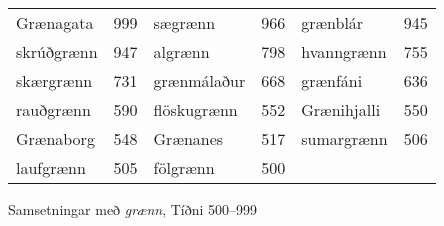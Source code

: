 \documentclass[../samsetningasafn.tex]{subfiles}
\begin{document}
\begin{wordlist}[H]
\begin{tcolorbox}

	\setlength{\extrarowheight}{3pt}
	\begin{tabular}{BlBlBl}
		Grænagata	& 999		& 
		sægrænn		& 966		& 
		grænblár		& 945		\\  		
		skrúðgrænn	& 947		& 
		algrænn		& 798		&  	
		hvanngrænn	& 755		\\  	
		skærgrænn	& 731		& 
		grænmálaður	& 668		& 	
		grænfáni		& 636		\\ 
		rauðgrænn	& 590		& 
		flöskugrænn	& 552		& 	
		Grænihjalli	& 550		\\ 
		Grænaborg	& 548		& 
		Grænanes	& 517		& 
		sumargrænn	& 506		\\ 	
		laufgrænn	& 505		& 
		fölgrænn		& 500		& 	
					& 
	\end{tabular}

\end{tcolorbox}
	\caption{Samsetningar með \textit{grænn}, Tíðni 500--999}
	\label{listi:graent.500}
\end{wordlist}	
\end{document}
